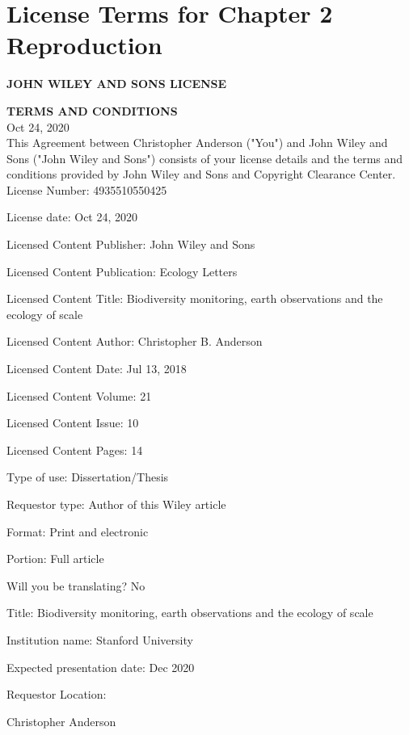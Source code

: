 \chapter{License Terms for Chapter 2 Reproduction}

\noindent \textbf{JOHN WILEY AND SONS LICENSE}

\noindent \textbf{TERMS AND CONDITIONS}\\

\noindent Oct 24, 2020\\

This Agreement between Christopher Anderson ("You") and John Wiley and Sons ("John Wiley and Sons") consists of your license details and the terms and conditions provided by John Wiley and Sons and Copyright Clearance Center.\\

\noindent License Number: 4935510550425

\noindent License date: Oct 24, 2020

\noindent Licensed Content Publisher: John Wiley and Sons

\noindent Licensed Content Publication: Ecology Letters

\noindent Licensed Content Title: Biodiversity monitoring, earth observations and the ecology of scale

\noindent Licensed Content Author: Christopher B. Anderson

\noindent Licensed Content Date: Jul 13, 2018

\noindent Licensed Content Volume: 21

\noindent Licensed Content Issue: 10

\noindent Licensed Content Pages: 14

\noindent Type of use: Dissertation/Thesis

\noindent Requestor type: Author of this Wiley article

\noindent Format: Print and electronic

\noindent Portion: Full article

\noindent Will you be translating? No

\noindent Title: Biodiversity monitoring, earth observations and the ecology of scale

\noindent Institution name: Stanford University

\noindent Expected presentation date: Dec 2020

\noindent Requestor Location:

Christopher Anderson

